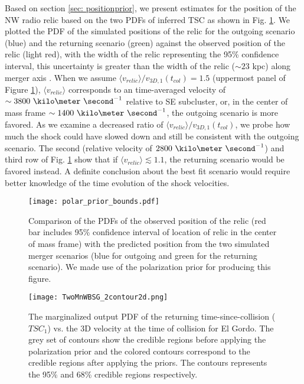 Based on section \ref{sec: positionprior}, we
present estimates for the position of the NW radio relic based on the two PDFs
of inferred TSC as shown in Fig. \ref{fig: positionprior}. We plotted
the PDF of the simulated positions of the relic for the outgoing scenario
(blue) and the returning scenario (green) against
the observed position of the relic (light red), with the width of the
relic representing the 95\% confidence interval, this uncertainty is greater than the width of the relic ($\sim$$23$
kpc) along merger axis \citep{L13}. When we
assume $\langle v_{relic} \rangle / v_{3D, 1}(t_{col}) = 1.5$ (uppermost
panel of Figure \ref{fig: positionprior}), $\langle v_{relic} \rangle$
corresponds to an time-averaged velocity of $\sim3800~\kilo
\meter~\second^{-1}$ relative to SE subcluster, or, in the center of
mass frame $\sim1400~\kilo\meter~\second^{-1}$, the outgoing scenario 
is more favored.  As we examine a decreased ratio of  $\langle v_{relic} \rangle /
v_{3D,1}(t_{col})$, we probe how much the shock could have slowed down
and still be consistent with the outgoing scenario. The second (relative
velocity of $2800~\kilo\meter~\second^{-1}$) and third row of
Fig. \ref{fig: positionprior} show that if $\langle v_{relic} \rangle
\lesssim 1.1 $, the returning scenario would be favored instead.
A definite conclusion about the best fit scenario would require better
knowledge of the time evolution of the shock velocities. 





\begin{figure}
	\texttt{[image: polar\_prior\_bounds.pdf]}
	\caption{Comparison of the PDFs of the observed position of the relic (red bar
		includes 95\% confidence interval of location of relic in the center of
		mass frame) with the	predicted position from the two simulated merger scenarios (blue for
	outgoing and green for the returning scenario). We made use of the polarization prior for producing this figure. 
	\label{fig: positionprior}}
\end{figure}

\begin{figure}
	\texttt{[image: TwoMnWBSG\_2contour2d.png]}
	\caption{The marginalized output PDF of the returning time-since-collision
($TSC_1$) vs. the 3D velocity at the time of collision for El Gordo. The
grey set of contours show the credible regions before applying the
polarization prior and the colored contours correspond to the credible
regions after applying the priors. The contours represents the 95\% and
68\% credible regions respectively. }
	\label{fig:TSC_v3D}
\end{figure}

